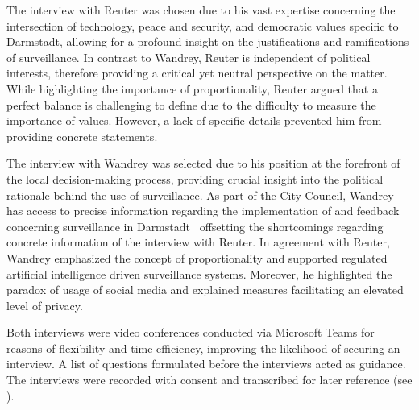 \documentclass[12pt]{article}
\begin{document}
	The interview with Reuter was chosen due to his vast expertise concerning the intersection of technology, peace and security, and democratic values specific to Darmstadt, allowing for a profound insight on the justifications and ramifications of surveillance. In contrast to Wandrey, Reuter is independent of political interests, therefore providing a critical yet neutral perspective on the matter. While highlighting the importance of proportionality, Reuter argued that a perfect balance is challenging to define due to the difficulty to measure the importance of values. However, a lack of specific details prevented him from providing concrete statements.
	
	The interview with Wandrey was selected due to his position at the forefront of the local decision-making process, providing crucial insight into the political rationale behind the use of surveillance. As part of the City Council, Wandrey has access to precise information regarding the implementation of and feedback concerning surveillance in Darmstadt \textemdash\ offsetting the shortcomings regarding concrete information of the interview with Reuter. In agreement with Reuter, Wandrey emphasized the concept of proportionality and supported regulated artificial intelligence driven surveillance systems. Moreover, he highlighted the paradox of usage of social media and explained measures facilitating an elevated level of privacy.
	
	Both interviews were video conferences conducted via Microsoft Teams for reasons of flexibility and time efficiency, improving the likelihood of securing an interview. A list of questions formulated before the interviews acted as guidance. The interviews were recorded with consent and transcribed for later reference (see ). 
	
\end{document}
